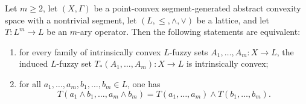 \documentclass[10pt,a4paper]{amsart}
\begin{document}
\begin{theorem}\label{teo_sharp_induced}
Let \(m\geq 2\), let \((X,\Gamma)\) be a point-convex segment-generated abstract convexity space with a nontrivial segment, let \((L,\leq,\wedge,\vee)\) be a lattice, and let \(T:L^m\to L\) be an \(m\)-ary operator. Then the following statements are equivalent:
\begin{enumerate}
    \item for every family of intrinsically convex \(L\)-fuzzy sets \(A_1,\dots,A_m:X\to L\), the induced \(L\)-fuzzy set \(T_*(A_1,\dots,A_m):X\to L\) is intrinsically convex;
    \item for all \(a_1,\dots,a_m,b_1,\dots,b_m\in L\), one has
    \[
    T(a_1\wedge b_1,\dots,a_m\wedge b_m)
    =
    T(a_1,\dots,a_m)\wedge T(b_1,\dots,b_m).
    \]
\end{enumerate}
\end{theorem}
\end{document}
